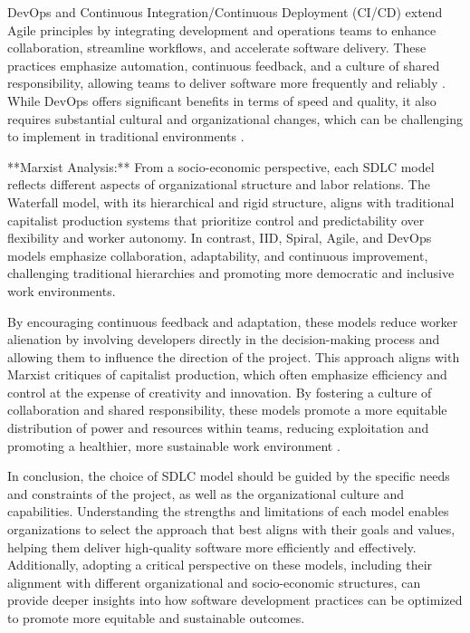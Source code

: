 \begin{refsection}
DevOps and Continuous Integration/Continuous Deployment (CI/CD) extend Agile principles by integrating development and operations teams to enhance collaboration, streamline workflows, and accelerate software delivery. These practices emphasize automation, continuous feedback, and a culture of shared responsibility, allowing teams to deliver software more frequently and reliably \cite[pp.~65-90]{duvall2007continuous}. While DevOps offers significant benefits in terms of speed and quality, it also requires substantial cultural and organizational changes, which can be challenging to implement in traditional environments \cite[pp.~3-24]{kim2021devops}.

**Marxist Analysis:** From a socio-economic perspective, each SDLC model reflects different aspects of organizational structure and labor relations. The Waterfall model, with its hierarchical and rigid structure, aligns with traditional capitalist production systems that prioritize control and predictability over flexibility and worker autonomy. In contrast, IID, Spiral, Agile, and DevOps models emphasize collaboration, adaptability, and continuous improvement, challenging traditional hierarchies and promoting more democratic and inclusive work environments.

By encouraging continuous feedback and adaptation, these models reduce worker alienation by involving developers directly in the decision-making process and allowing them to influence the direction of the project. This approach aligns with Marxist critiques of capitalist production, which often emphasize efficiency and control at the expense of creativity and innovation. By fostering a culture of collaboration and shared responsibility, these models promote a more equitable distribution of power and resources within teams, reducing exploitation and promoting a healthier, more sustainable work environment \cite[pp.~157-180]{womack2013lean}.

In conclusion, the choice of SDLC model should be guided by the specific needs and constraints of the project, as well as the organizational culture and capabilities. Understanding the strengths and limitations of each model enables organizations to select the approach that best aligns with their goals and values, helping them deliver high-quality software more efficiently and effectively. Additionally, adopting a critical perspective on these models, including their alignment with different organizational and socio-economic structures, can provide deeper insights into how software development practices can be optimized to promote more equitable and sustainable outcomes.


\end{refsection}
